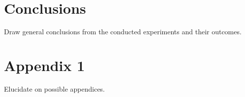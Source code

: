 \documentclass[a4paper,10pt, twocolumn]{article}
\begin{document}
\section{Conclusions}
Draw general conclusions from the conducted experiments and their outcomes.

\appendix
\section{Appendix 1}
Elucidate on possible appendices.


\nocite{goodfellow2014generativeadversarialnetworks}
\nocite{isola2018imagetoimagetranslationconditionaladversarial}
\nocite{DBLP:journals/corr/MirzaO14}



\end{document}
